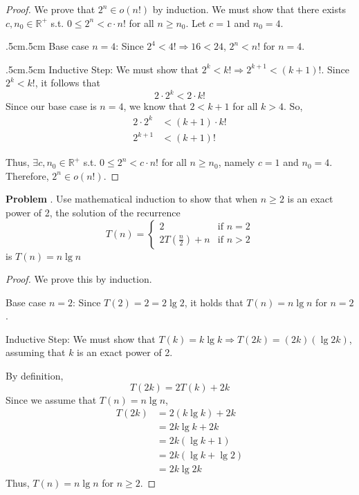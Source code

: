 \documentclass[11pt]{article}
\newcommand{\bb}[1]{\mathbb{#1}}
\newcounter{problem}
\newcommand{\problem}[1]{
    \refstepcounter{problem}
    \noindent\textbf{Problem \theproblem}. #1
}
\theoremstyle{claim}
\begin{document}
\begin{proof}
We prove that \(2^n \in o(n!)\) by induction. We must show that there exists \(c, n_0 \in \bb{R}^+\) s.t. \(0 \leq 2^n < c \cdot n!\) for all \(n \geq n_0\). Let \(c = 1\) and \(n_0 = 4\).

\begin{adjustwidth}{.5cm}{.5cm}
\noindent
Base case \(n = 4\): Since \(2^4 < 4! \Rightarrow 16 < 24\), \(2^n < n!\) for \(n = 4\).
\end{adjustwidth}

\begin{adjustwidth}{.5cm}{.5cm}
\noindent
Inductive Step: We must show that \(2^k < k! \Rightarrow 2^{k+1} < (k+1)!\). Since \(2^k < k!\), it follows that
\[
    2 \cdot 2^k < 2 \cdot k!
\]
Since our base case is \(n = 4\), we know that \(2 < k + 1\) for all \(k > 4\). So,
\begin{align*}
    2 \cdot 2^k &< (k+1) \cdot k! \\
    2^{k+1}     &< (k+1)!
\end{align*}
\end{adjustwidth}
Thus, \(\exists c, n_0 \in \bb{R}^+\) s.t. \(0 \leq 2^n < c \cdot n!\) for all \(n \geq n_0\), namely \(c = 1\) and \(n_0 = 4\). Therefore, \(2^n \in o(n!)\).
\end{proof}

\pagebreak

\problem{%
    Use mathematical induction to show that when \(n \geq 2\) is an exact power of 2, the solution of the recurrence
    \[
        T(n) = \begin{cases}
            2                   &\text{if } n = 2 \\
            2T(\frac{n}{2}) + n &\text{if } n > 2
        \end{cases}
    \]
is \(T(n) = n \lg n\)
}

\begin{proof}
We prove this by induction.

Base case \(n = 2\): Since \(T(2) = 2 = 2 \lg 2\), it holds that \(T(n) = n \lg n\) for \(n = 2\).

\noindent
Inductive Step: We must show that \(T(k) = k \lg k \Rightarrow T(2k) = (2k) (\lg 2k)\), assuming that \(k\) is an exact power of 2.

By definition,
\[
    T(2k) = 2 T(k) + 2k
\]
Since we assume that \(T(n) = n \lg n\),
\begin{align*}
    T(2k) &= 2 (k \lg k) + 2k \\
          &= 2k \lg k + 2k \\
          &= 2k (\lg k + 1) \\
          &= 2k (\lg k + \lg 2) \\
          &= 2k \lg 2k
\end{align*}
Thus, \(T(n) = n \lg n\) for \(n \geq 2\).
\end{proof}
\end{document}
